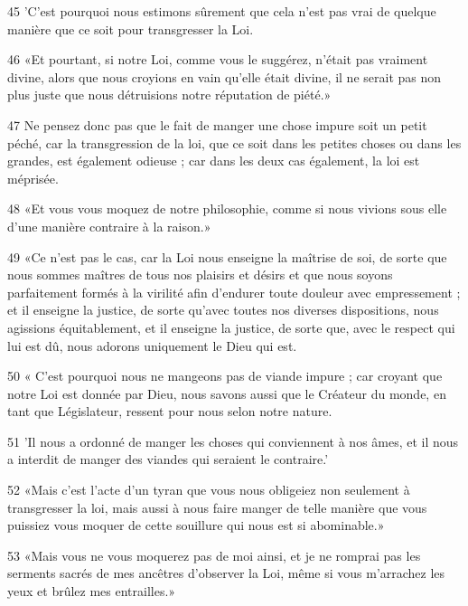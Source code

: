 \par 45 'C'est pourquoi nous estimons sûrement que cela n'est pas vrai de quelque manière que ce soit pour transgresser la Loi.

\par 46 «Et pourtant, si notre Loi, comme vous le suggérez, n'était pas vraiment divine, alors que nous croyions en vain qu'elle était divine, il ne serait pas non plus juste que nous détruisions notre réputation de piété.»

\par 47 Ne pensez donc pas que le fait de manger une chose impure soit un petit péché, car la transgression de la loi, que ce soit dans les petites choses ou dans les grandes, est également odieuse ; car dans les deux cas également, la loi est méprisée.

\par 48 «Et vous vous moquez de notre philosophie, comme si nous vivions sous elle d'une manière contraire à la raison.»

\par 49 «Ce n'est pas le cas, car la Loi nous enseigne la maîtrise de soi, de sorte que nous sommes maîtres de tous nos plaisirs et désirs et que nous soyons parfaitement formés à la virilité afin d'endurer toute douleur avec empressement ; et il enseigne la justice, de sorte qu'avec toutes nos diverses dispositions, nous agissions équitablement, et il enseigne la justice, de sorte que, avec le respect qui lui est dû, nous adorons uniquement le Dieu qui est.

\par 50 « C'est pourquoi nous ne mangeons pas de viande impure ; car croyant que notre Loi est donnée par Dieu, nous savons aussi que le Créateur du monde, en tant que Législateur, ressent pour nous selon notre nature.

\par 51 'Il nous a ordonné de manger les choses qui conviennent à nos âmes, et il nous a interdit de manger des viandes qui seraient le contraire.'

\par 52 «Mais c'est l'acte d'un tyran que vous nous obligeiez non seulement à transgresser la loi, mais aussi à nous faire manger de telle manière que vous puissiez vous moquer de cette souillure qui nous est si abominable.»

\par 53 «Mais vous ne vous moquerez pas de moi ainsi, et je ne romprai pas les serments sacrés de mes ancêtres d'observer la Loi, même si vous m'arrachez les yeux et brûlez mes entrailles.»

